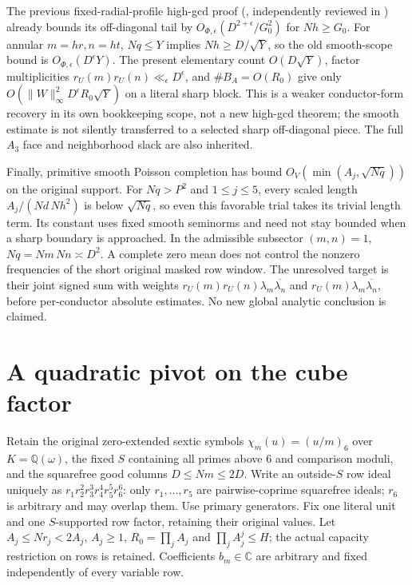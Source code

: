 \documentclass[11pt,oneside,openany]{book}
\theoremstyle{definition}\newtheorem{definition}[theorem]{Definition}
\theoremstyle{remark}\newtheorem{remark}[theorem]{Remark}
\begin{document}
The previous fixed-radial-profile high-gcd proof
(, independently reviewed in
)
already bounds its off-diagonal tail by
$O_{\Phi,\epsilon}(D^{2+\epsilon}/G_0^2)$ for $Nh\ge G_0$.
For annular $m=hr,n=ht$, $Nq\le Y$ implies $Nh\ge D/\sqrt Y$,
so the old smooth-scope bound is $O_{\Phi,\epsilon}(D^\epsilon Y)$.
The present elementary count $O(D\sqrt Y)$, factor multiplicities
$r_U(m)r_U(n)\ll_\epsilon D^\epsilon$, and $\#B_A=O(R_0)$ give only
$O(\|W\|_\infty^2D^\epsilon R_0\sqrt Y)$ on a literal sharp block.
This is a weaker conductor-form recovery in its own bookkeeping scope,
not a new high-gcd theorem; the smooth estimate is not silently
transferred to a selected sharp off-diagonal piece.
The full $A_3$ face and neighborhood slack are also inherited.

Finally, primitive smooth Poisson completion has bound
$O_V(\min(A_j,\sqrt{Nq}))$ on the original support.
For $Nq>P^2$ and $1\le j\le5$, every scaled length
$A_j/(Nd\,Nh^2)$ is below $\sqrt{Nq}$, so even this favorable trial
takes its trivial length term. Its constant uses fixed smooth
seminorms and need not stay bounded when a sharp boundary is approached.
In the admissible subsector $(m,n)=1$, $Nq=Nm\,Nn\asymp D^2$.
A complete zero mean does not control the nonzero frequencies of the
short original masked row window. The unresolved target is their
joint signed sum with weights $r_U(m)r_U(n)\lambda_m\overline{\lambda_n}$
and $r_U(m)\lambda_m\overline{\lambda_n}$, before per-conductor absolute
estimates. No new global analytic conclusion is claimed.

\section{A quadratic pivot on the cube factor}\label{qp:core}
Retain the original zero-extended sextic symbols
$\chi_m(u)=(u/m)_6$ over $K=\mathbb Q(\omega)$, the fixed $S$ containing
all primes above $6$ and comparison moduli, and the squarefree good columns
$D\le Nm\le2D$. Write an outside-$S$ row ideal uniquely as
$r_1r_2^2r_3^3r_4^4r_5^5r_6^6$: only $r_1,\ldots,r_5$ are pairwise-coprime
squarefree ideals; $r_6$ is arbitrary and may overlap them. Use primary
generators. Fix one literal unit and one $S$-supported row factor, retaining
their original values. Let $A_j\le Nr_j<2A_j$, $A_j\ge1$,
$R_0=\prod_jA_j$ and $\prod_jA_j^j\le H$; the actual capacity restriction
on rows is retained. Coefficients $b_m\in\mathbb C$ are arbitrary and fixed
independently of every variable row.
\end{document}
